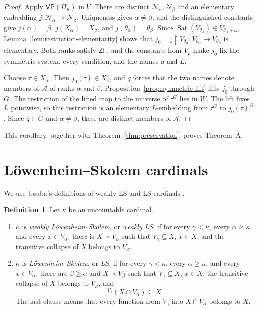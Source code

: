 \documentclass[11pt,a4paper]{amsart}
\newcommand{\VP}{\mathsf{VP}}
\newcommand{\ZF}{\mathsf{ZF}}
\newcommand{\restr}{\mathbin{\upharpoonright}}
\theoremstyle{plain}
\theoremstyle{definition}
\newtheorem{definition}[theorem]{Definition}
\theoremstyle{remark}
\begin{document}
\begin{proof}
Apply $\VP(\Pi_n)$ in $V$.  There are distinct $\mathcal N_\alpha,\mathcal N_\beta$ and an elementary embedding $j:\mathcal N_\alpha\to\mathcal N_\beta$.  Uniqueness gives $\alpha\ne\beta$, and the distinguished constants give $j(\alpha)=\beta$, $j(X_\alpha)=X_\beta$, and $j(\theta_\alpha)=\theta_\beta$.  {Since $\operatorname{Sat}(V_{\theta_\alpha})\in V_{\theta_\alpha+\omega}$, Lemma~\ref{lem:restriction-elementarity} shows that $j_0=j\restr V_{\theta_\alpha}:V_{\theta_\alpha}\longrightarrow V_{\theta_\beta}$ is elementary.}  Both ranks satisfy $\ZF$, and the constants from $V_\rho$ make $j_0$ fix the symmetric system, every condition, and the names $\dot a$ and $\dot L$.

{Choose $\tau\in X_\alpha$.}  Then $j_0(\tau)\in X_\beta$, and $q$ forces that the two names denote members of $\mathcal A$ of ranks $\alpha$ and $\beta$.  Proposition~\ref{prop:symmetric-lift} lifts $j_0$ through $G$.  The restriction of the lifted map to the universe of $\tau^G$ lies in $W$.  {The lift fixes $L$ pointwise, so this restriction is an elementary $L$-embedding from $\tau^G$ to $j_0(\tau)^G$.}  Since $q\in G$ and $\alpha\ne\beta$, these are distinct members of $\mathcal A$.
\end{proof}

This corollary, together with Theorem~\ref{thm:preservation}, proves Theorem~A.

\endgroup

\begingroup

\section{L\"owenheim--Skolem cardinals}\label{sec:LS}

We use Usuba's definitions of weakly LS and LS cardinals \cite[Definition~1.1]{Usuba}.

\begin{definition}\label{def:LS}
Let $\kappa$ be an uncountable cardinal.
\begin{enumerate}
\item $\kappa$ is \emph{weakly L\"owenheim--Skolem}, or \emph{weakly LS}, if for every $\gamma<\kappa$, every $\alpha\geq\kappa$, and every $x\in V_\alpha$, there is $X\prec V_\alpha$ such that $V_\gamma\subseteq X$, $x\in X$, and the transitive collapse of $X$ belongs to $V_\kappa$.
\item $\kappa$ is \emph{L\"owenheim--Skolem}, or \emph{LS}, if for every $\gamma<\kappa$, every $\alpha\geq\kappa$, and every $x\in V_\alpha$, there are $\beta\geq\alpha$ and $X\prec V_\beta$ such that $V_\gamma\subseteq X$, $x\in X$, the transitive collapse of $X$ belongs to $V_\kappa$, and
\[
{}^{V_\gamma}(X\cap V_\alpha)\subseteq X.
\]
The last clause means that every function from $V_\gamma$ into $X\cap V_\alpha$ belongs to $X$.
\end{enumerate}
\end{definition}
\end{document}
